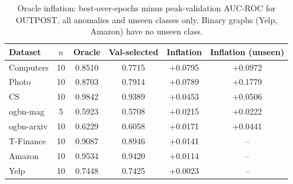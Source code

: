 \begin{table}[t]
\centering
\small
\begin{tabular}{lccccc}
\toprule
Dataset & $n$ & Oracle & Val-selected & Inflation & Inflation (unseen) \\
\midrule
Computers & 10 & 0.8510 & 0.7715 & +0.0795 & +0.0972 \\
Photo & 10 & 0.8703 & 0.7914 & +0.0789 & +0.1779 \\
CS & 10 & 0.9842 & 0.9389 & +0.0453 & +0.0506 \\
ogbn-mag & 5 & 0.5923 & 0.5708 & +0.0215 & +0.0222 \\
ogbn-arxiv & 10 & 0.6229 & 0.6058 & +0.0171 & +0.0441 \\
T-Finance & 10 & 0.9087 & 0.8946 & +0.0141 & -- \\
Amazon & 10 & 0.9534 & 0.9420 & +0.0114 & -- \\
Yelp & 10 & 0.7448 & 0.7425 & +0.0023 & -- \\
\bottomrule
\end{tabular}
\caption{Oracle inflation: best-over-epochs minus peak-validation AUC-ROC for OUTPOST, all anomalies and unseen classes only. Binary graphs (Yelp, Amazon) have no unseen class.}
\label{tab:inflation}
\end{table}
